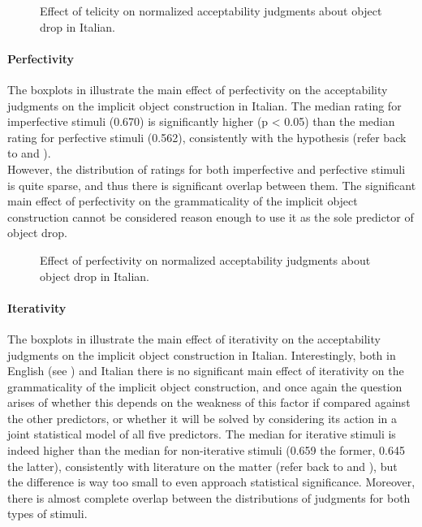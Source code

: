 \begin{figure}[htb]
\caption{Effect of telicity on normalized acceptability judgments about object drop in Italian.}
    
\end{figure}

\paragraph{Perfectivity}
The boxplots in  illustrate the main effect of perfectivity on the acceptability judgments on the implicit object construction in Italian. The median rating for imperfective stimuli (0.670) is significantly higher (p < 0.05) than the median rating for perfective stimuli (0.562), consistently with the hypothesis (refer back to  and ).\\
However, the distribution of ratings for both imperfective and perfective stimuli is quite sparse, and thus there is significant overlap between them. The significant main effect of perfectivity on the grammaticality of the implicit object construction cannot be considered reason enough to use it as the sole predictor of object drop.

\begin{figure}[htb]
\caption{Effect of perfectivity on normalized acceptability judgments about object drop in Italian.}
    
\end{figure}

\paragraph{Iterativity}
The boxplots in  illustrate the main effect of iterativity on the acceptability judgments on the implicit object construction in Italian. Interestingly, both in English (see ) and Italian there is no significant main effect of iterativity on the grammaticality of the implicit object construction, and once again the question arises of whether this depends on the weakness of this factor if compared against the other predictors, or whether it will be solved by considering its action in a joint statistical model of all five predictors. The median for iterative stimuli is indeed higher than the median for non-iterative stimuli (0.659 the former, 0.645 the latter), consistently with literature on the matter (refer back to  and ), but the difference is way too small to even approach statistical significance. Moreover, there is almost complete overlap between the distributions of judgments for both types of stimuli.

